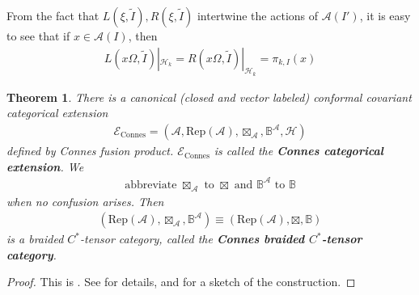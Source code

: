 \documentclass[11pt,b5paper,notitlepage]{article}
\theoremstyle{definition}
\theoremstyle{plain}
\newtheorem{thm}[df]{Theorem}
\newcommand{\mc}{\mathcal}
\newcommand{\wtd}{\widetilde}
\newcommand{\Rep}{\mathrm{Rep}}
\newcommand{\scr}{\mathscr}
\newcommand{\mbb}{\mathbb}
\numberwithin{equation}{section}
\begin{document}
From the fact that $L(\xi,\wtd I),R(\xi,\wtd I)$ intertwine the actions of $\mc A(I')$, it is easy to see that if $x\in\mc A(I)$, then
\begin{align}\label{eq3}
L(x\Omega,\wtd I)|_{\mc H_k}=R(x\Omega,\wtd I)|_{\mc H_k}=\pi_{k,I}(x)
\end{align}


\begin{thm}\label{lb12}
There is a canonical (closed and vector labeled) conformal covariant categorical extension
\begin{align*}
\scr E_{\mathrm{Connes}}=(\mc A,\Rep(\mc A),\boxtimes_{\mc A},\mbb B^{\mc A},\mc H)
\end{align*}
defined by Connes fusion product. $\scr E_{\mathrm{Connes}}$ is called the \textbf{Connes categorical extension}. We
\begin{align*}
\text{abbreviate $\boxtimes_{\mc A}$ to $\boxtimes$ and $\mbb B^{\mc A}$ to $\mbb B$}
\end{align*}
when no confusion arises. Then
\begin{align*}
(\Rep(\mc A),\boxtimes_{\mc A},\mbb B^{\mc A})\equiv (\Rep(\mc A),\boxtimes,\mbb B)
\end{align*}
is a braided $C^*$-tensor category, called the \textbf{Connes braided $C^*$-tensor category}.
\end{thm}

\begin{proof}
This is \cite[Thm. 3.4, 3.5]{Gui21a}. See \cite{Gui21a} for details, and \cite[Sec. A, B]{Gui21b} for a sketch of the construction.
\end{proof}
\end{document}
